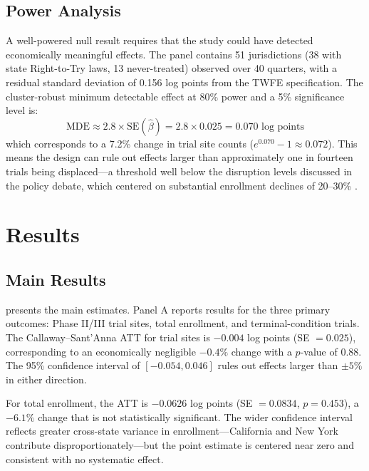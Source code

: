 \documentclass[12pt]{article}
\begin{document}
\subsection{Power Analysis}

A well-powered null result requires that the study could have detected economically meaningful effects. The panel contains 51 jurisdictions (38 with state Right-to-Try laws, 13 never-treated) observed over 40 quarters, with a residual standard deviation of 0.156 log points from the TWFE specification. The cluster-robust minimum detectable effect at 80\% power and a 5\% significance level is:
\begin{equation}
    \text{MDE} \approx 2.8 \times \text{SE}(\hat{\beta}) = 2.8 \times 0.025 = 0.070 \text{ log points}
\end{equation}
which corresponds to a 7.2\% change in trial site counts ($e^{0.070} - 1 \approx 0.072$). This means the design can rule out effects larger than approximately one in fourteen trials being displaced---a threshold well below the disruption levels discussed in the policy debate, which centered on substantial enrollment declines of 20--30\% \citep{bateman2015right}.


\section{Results}\label{sec:results}

\subsection{Main Results}

 presents the main estimates. Panel A reports results for the three primary outcomes: Phase II/III trial sites, total enrollment, and terminal-condition trials. The Callaway--Sant'Anna ATT for trial sites is $-0.004$ log points (SE $= 0.025$), corresponding to an economically negligible $-0.4\%$ change with a $p$-value of 0.88. The 95\% confidence interval of $[-0.054, 0.046]$ rules out effects larger than $\pm 5\%$ in either direction.

For total enrollment, the ATT is $-0.0626$ log points (SE $= 0.0834$, $p = 0.453$), a $-6.1\%$ change that is not statistically significant. The wider confidence interval reflects greater cross-state variance in enrollment---California and New York contribute disproportionately---but the point estimate is centered near zero and consistent with no systematic effect.
\end{document}
